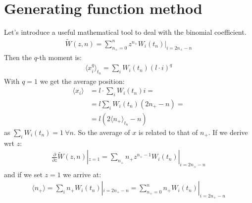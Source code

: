 \documentclass[../template.tex]{subfiles}
\begin{document}
\section{Generating function method}
Let's introduce a useful mathematical tool to deal with the binomial coefficient. 
\begin{align*}
    \widetilde{W} (z,n) = \sum_{n_+=0}^{n} z^{n_+} W_i(t_n) |_{i = 2n_+ -n}
\end{align*}
Then the $q$-th moment is:
\begin{align*}
    \langle x_i^q \rangle_{t_n} = \sum_i W_i(t_n) (l\cdot i)^q
\end{align*}
With $q=1$ we get the average position: 
\begin{align*}
    \langle x_i \rangle &= l \cdot \sum_i W_i(t_n) i =\\
    &= l \sum_i W_i(t_n) (2n_+ - n) =\\
    &= l(2\langle n_+ \rangle_{t_n} - n)
\end{align*}
as $\sum_i W_i(t_n) = 1 \> \forall n$. So the average of $x$ is related to that of $n_+$.
If we derive wrt $z$:
\begin{align*}
    \frac{\partial}{\partial z}\widetilde{W}(z,n) |_{z=1} = \sum_{n_+} n_+ z^{n_+ - 1}W_i(t_n) |_{i=2n_+ - n}
\end{align*} 
and if we set $z=1$ we arrive at: 
\begin{align*}
    \langle n_+ \rangle = \sum_i n_+ W_i(t_n) |_{i=2n_+ - n} = \sum_{n_+=0}^{n} n_+ W_i(t_n)|_{i=2n_+ - n} 
\end{align*}
\end{document}
